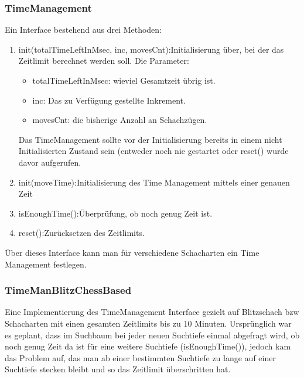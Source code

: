 \subsubsection {TimeManagement}
Ein Interface bestehend aus drei Methoden:
\begin{enumerate}
    \item{ init(totalTimeLeftInMsec, inc, movesCnt):\newline Initialisierung \"uber, bei der das Zeitlimit berechnet werden soll. \newline Die Parameter:
            \begin{itemize}
                \item{totalTimeLeftInMsec: wieviel Gesamtzeit übrig ist.}
                \item{inc: Das zu Verfügung gestellte Inkrement.}
                \item{movesCnt: die bisherige Anzahl an Schachzügen.}
            \end{itemize}
         Das TimeManagement sollte vor der Initialisierung bereits in einem nicht Initialisierten Zustand sein (entweder noch nie gestartet oder reset() wurde davor aufgerufen.}
    \item{ init(moveTime):\newline Initialisierung des Time Management mittels einer genauen Zeit}
    \item{ isEnoughTime():\newline Überprüfung, ob noch genug Zeit ist.}
    \item{ reset():\newline Zurücksetzen des Zeitlimits.}
\end{enumerate}
Über dieses Interface kann man für verschiedene Schacharten ein Time Management festlegen.

\subsubsection{TimeManBlitzChessBased}
Eine Implementierung des TimeManagement Interface gezielt auf Blitzschach bzw Schacharten mit einen gesamten Zeitlimits bis zu 10 Minuten. \newline
Urspr\"unglich war es geplant, dass im Suchbaum bei jeder neuen Suchtiefe einmal abgefragt wird, ob noch genug Zeit da ist für eine weitere Suchtiefe (isEnoughTime()), jedoch kam das Problem auf, das man ab einer bestimmten Suchtiefe zu lange auf einer Suchtiefe stecken bleibt und so das Zeitlimit überschritten hat. 

